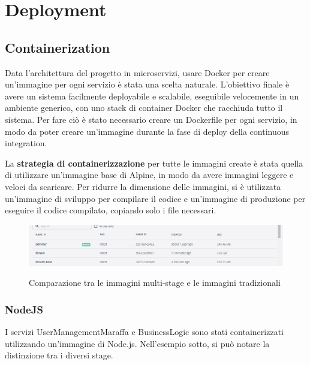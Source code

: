\chapter{Deployment}
\label{ch:deployment}
\section{Containerization}

Data l'architettura del progetto in microservizi, usare Docker per creare un'immagine per ogni servizio è stata una scelta naturale. 
L'obiettivo finale è avere un sistema facilmente deployabile e scalabile, eseguibile velocemente in un ambiente generico, con uno stack di container Docker che racchiuda tutto il sistema.
Per fare ciò è stato necessario creare un Dockerfile per ogni servizio, in modo da poter creare un'immagine durante la fase di deploy della continuous integration.
\vspace{1cm}

La \textbf{strategia di containerizzazione} per tutte le immagini create è stata quella di utilizzare un'immagine base di Alpine, in modo da avere immagini leggere e veloci da scaricare. Per ridurre la dimensione delle immagini,
si è utilizzata un'immagine di sviluppo per compilare il codice e un'immagine di produzione per eseguire il codice compilato, copiando solo i file necessari.

\begin{figure}[H]
\caption{Comparazione tra le immagini multi-stage e le immagini tradizionali}
\centering
\includegraphics[width=12cm]{report/img/multi_stage.png}\\[5.5cm]
\end{figure}

\subsection{NodeJS}

I servizi UserManagementMaraffa e BusinessLogic sono stati containerizzati utilizzando un'immagine di Node.js. Nell'esempio sotto, si può notare la distinzione tra i diversi stage.
\vspace{1cm}

